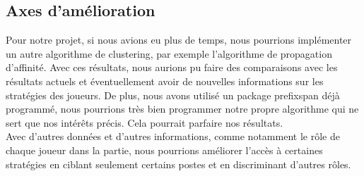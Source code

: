 \documentclass{article}
\begin{document}
        \subsection{Axes d'amélioration}
        Pour notre projet, si nous avions eu plus de temps, nous pourrions implémenter un autre algorithme de clustering, par exemple l'algorithme de propagation d'affinité. Avec ces résultats, nous aurions pu faire des comparaisons avec les résultats actuels et éventuellement avoir de nouvelles informations sur les stratégies des joueurs.
        De plus, nous avons utilisé un package prefixspan déjà programmé, nous pourrions très bien programmer notre propre algorithme qui ne sert que nos intérêts précis. Cela pourrait parfaire nos résultats.\\
        Avec d'autres données et d'autres informations, comme notamment le rôle de chaque joueur dans la partie, nous pourrions améliorer l'accès à certaines stratégies en ciblant seulement certains postes et en discriminant d'autres rôles.
        
        
\end{document}
